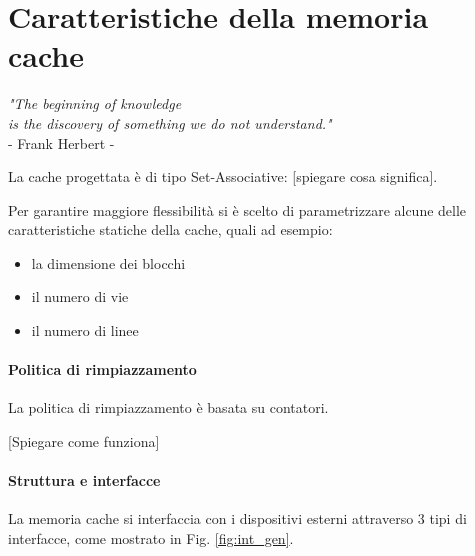 \clearpage{\pagestyle{empty}\cleardoublepage}
\chapter{Caratteristiche della memoria cache}

\begin{flushright}\begin{small}\textit{"The beginning of knowledge\\
 is the discovery of something we do not understand."}\\
- Frank Herbert -\\
\end{small}\end{flushright}

La cache progettata \`e di tipo Set-Associative: [spiegare cosa significa].


Per garantire maggiore flessibilit\`a si \`e scelto di parametrizzare alcune delle caratteristiche statiche della cache, quali ad esempio:
\begin{itemize}
\item la dimensione dei blocchi
\item	il numero di vie 
\item il numero di linee
\end{itemize}


\subsubsection{Politica di rimpiazzamento}
La politica di rimpiazzamento \`e basata su contatori.

[Spiegare come funziona]

\subsubsection{Struttura e interfacce}
La memoria cache si interfaccia con i dispositivi esterni attraverso 3 tipi di interfacce, come mostrato in Fig. \ref{fig:int_gen}.


